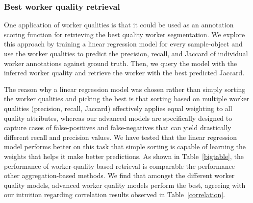     \subsubsection{Best worker quality retrieval}
    One application of worker qualities is that it could be used as an annotation scoring function for retrieving the best quality worker segmentation. We explore this approach by training a linear regression model for every sample-object and use the worker qualities to predict the precision, recall, and Jaccard of individual worker annotations against ground truth. Then, we query the model with the inferred worker quality and retrieve the worker with the best predicted Jaccard. 
    \par The reason why a linear regression model was chosen rather than simply sorting the worker qualities and picking the best is that sorting based on multiple worker qualities (precision, recall, Jaccard) effectively applies equal weighting to all quality attributes, whereas our advanced models are specifically designed to capture cases of false-positives and false-negatives that can yield drastically different recall and precision values. We have tested that the linear regression model performs better on this task that simple sorting is capable of learning the weights that helps it make better predictions. As shown in Table~\ref{bigtable}, the performance of worker-quality based retrieval is comparable the performance other aggregation-based methods. We find that amongst the different worker quality models, advanced worker quality models perform the best, agreeing with our intuition regarding correlation results observed in Table~\ref{correlation}.
